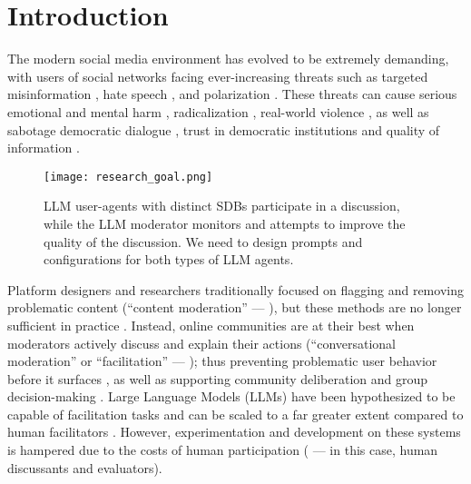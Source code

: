 %
\section{Introduction}
\label{sec:introduction}

The modern social media environment has evolved to be extremely demanding, with users of social networks facing ever-increasing threats such as targeted misinformation \cite{clemons2025disinformation, Denniss2025Social}, hate speech \cite{kolluri2025parler}, and polarization \cite{pranesh2024impactsocialmediapolarization}. These threats can cause serious emotional and mental harm \citep{proactive_moderation}, radicalization \citep{cho-etal-2024-language}, real-world violence \citep{schaffner_community_guidelines}, as well as sabotage democratic dialogue \citep{esau2017design, falk-etal-2021-predicting, seering_self_moderation}, trust in democratic institutions \citep{schroeder-etal-2024-fora} and quality of information \citep{make_reddit_great}.

\begin{figure}[t]
	\centering
	\texttt{[image: research\_goal.png]}
	\caption{LLM user-agents with distinct SDBs participate in a discussion, while the LLM moderator monitors and attempts to improve the quality of the discussion. We need to design prompts and configurations for both types of LLM agents.}
	\label{fig::goals}
\end{figure}


Platform designers and researchers traditionally focused on flagging and removing problematic content (``content moderation'' --- \citet{seering_self_moderation, cresci_pesonalized_interventions}), but these methods are no longer sufficient in practice \cite{horta_automated_moderation, schaffner_community_guidelines, small-polis-llm, korre2025evaluation}. Instead, online communities are at their best when moderators actively discuss and explain their actions (``conversational moderation'' or ``facilitation'' --- \citet{argyle2023, korre2025evaluation, falk-etal-2021-predicting}); thus preventing problematic user behavior before it surfaces \cite{cho-etal-2024-language, seering_self_moderation, cresci_pesonalized_interventions, make_reddit_great}, as well as supporting community deliberation and group decision-making \cite{kim_et_al_chatbot, seering_self_moderation}. Large Language Models (LLMs) have been hypothesized to be capable of facilitation tasks and can be scaled to a far greater extent compared to human facilitators \cite{korre2025evaluation, small-polis-llm}. However, experimentation and development on these systems is hampered due to the costs of human participation (\citet{rossi_2024} --- in this case, human discussants and evaluators). 


